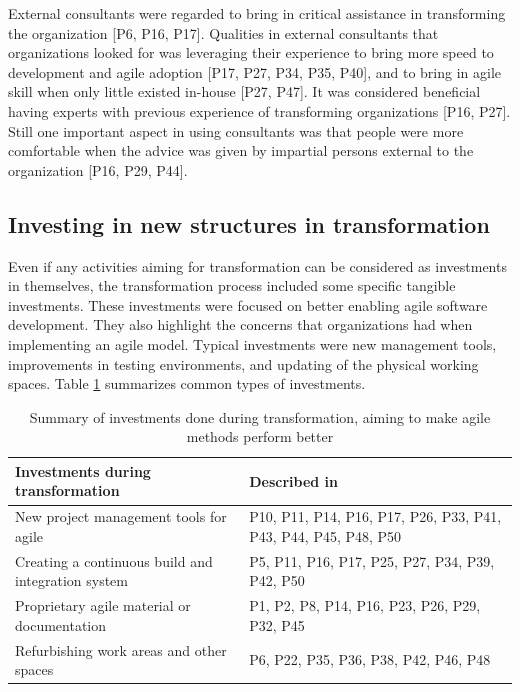 External consultants were regarded to bring in critical assistance in
transforming the organization [P6, P16, P17]. Qualities in external consultants
that organizations looked for was leveraging their experience to bring more
speed to development and agile adoption [P17, P27, P34, P35, P40], and to bring
in agile skill when only little existed in-house [P27, P47]. It was considered
beneficial having experts with previous experience of transforming organizations
[P16, P27].
Still one important aspect in using consultants was that people were more
comfortable when the advice was given by impartial persons external to the
organization [P16, P29, P44].



\subsection{Investing in new structures in transformation}

Even if any activities aiming for transformation can be considered as
investments in themselves, the transformation process included some specific
tangible investments. These investments were focused on better enabling agile
software development. They also highlight the concerns that organizations had
when implementing an agile model. Typical investments were new management tools,
improvements in testing environments, and updating of the physical working
spaces. Table \ref{table:transformation_investments} summarizes common types of
investments.


\begin{table}[h]
    \centering
    \begin{tabular}{ >{\raggedright\arraybackslash}p{}
                     >{\raggedright\arraybackslash}p{} }
        \toprule
        Investments during transformation      &  Described in  \\
        \midrule
        New project management tools for agile  &
                P10, P11, P14, P16, P17, P26, P33,
                P41, P43, P44, P45, P48, P50 \\
        Creating a continuous build and integration system  &
                P5, P11, P16, P17, P25, P27, P34, P39, P42, P50 \\
        Proprietary agile material or documentation   & 
                P1, P2, P8, P14, P16, P23, P26, P29, P32, P45  \\
        Refurbishing work areas and other spaces   &
                P6, P22, P35, P36, P38, P42, P46, P48 \\
        \bottomrule
    \end{tabular}
    \caption{Summary of investments done during transformation, aiming to make
             agile methods perform better}
    \label{table:transformation_investments}
\end{table}

